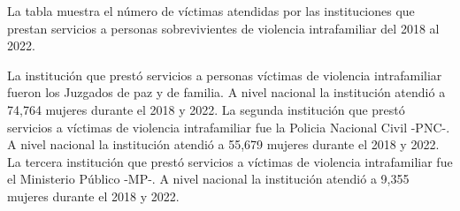 La tabla muestra el número de víctimas atendidas por las instituciones que prestan servicios a personas sobrevivientes de violencia intrafamiliar del 2018 al 2022. 

La institución que prestó servicios a personas víctimas de violencia intrafamiliar fueron los Juzgados de paz y de familia. A nivel nacional la institución atendió a 74,764 mujeres durante el 2018 y 2022. La segunda institución que prestó servicios a víctimas de violencia intrafamiliar fue la Policia Nacional Civil -PNC-. A nivel nacional la institución atendió a 55,679 mujeres durante el 2018 y 2022. La tercera institución que prestó servicios a víctimas de violencia intrafamiliar fue el Ministerio Público -MP-. A nivel nacional la institución atendió a 9,355 mujeres durante el 2018 y 2022.